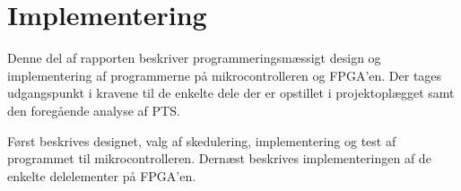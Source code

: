 \part{Implementering}
Denne del af rapporten beskriver programmeringsmæssigt design og implementering af programmerne
på mikrocontrolleren og FPGA'en.
Der tages udgangspunkt i kravene til de enkelte dele der er opstillet i projektoplægget samt den foregående analyse af PTS.

Først beskrives designet, valg af skedulering,
implementering og test af programmet til mikrocontrolleren.
Dernæst beskrives implementeringen af de enkelte delelementer på FPGA'en.


%
